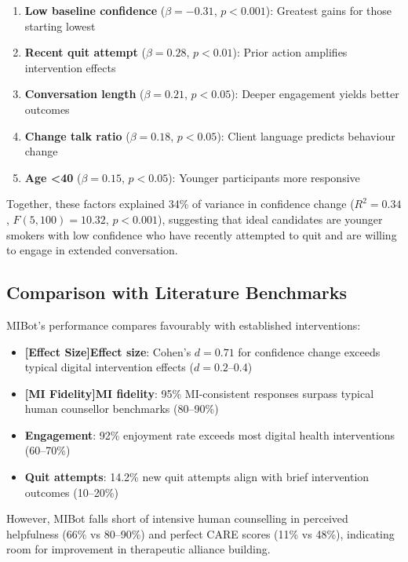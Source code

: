 \begin{enumerate}
\item \textbf{Low baseline confidence} ($\beta=-0.31$, $p<0.001$): Greatest gains for those starting lowest
\item \textbf{Recent quit attempt} ($\beta=0.28$, $p<0.01$): Prior action amplifies intervention effects
\item \textbf{Conversation length} ($\beta=0.21$, $p<0.05$): Deeper engagement yields better outcomes
\item \textbf{Change talk ratio} ($\beta=0.18$, $p<0.05$): Client language predicts behaviour change
\item \textbf{Age <40} ($\beta=0.15$, $p<0.05$): Younger participants more responsive
\end{enumerate}

Together, these factors explained 34\% of variance in confidence change ($R^2=0.34$, $F(5,100)=10.32$, $p<0.001$), suggesting that ideal candidates are younger smokers with low confidence who have recently attempted to quit and are willing to engage in extended conversation.

\subsection{Comparison with Literature Benchmarks}

MIBot's performance compares favourably with established interventions:

\begin{itemize}
\item \textbf{[Effect Size]Effect size}: Cohen's $d=0.71$ for confidence change exceeds typical digital intervention effects ($d=0.2$--0.4) \citep{Whittaker2016}
\item \textbf{[MI Fidelity]MI fidelity}: 95\% MI-consistent responses surpass typical human counsellor benchmarks (80--90\%) \citep{Moyers2016}
\item \textbf{Engagement}: 92\% enjoyment rate exceeds most digital health interventions (60--70\%) \citep{Perski2017}
\item \textbf{Quit attempts}: 14.2\% new quit attempts align with brief intervention outcomes (10--20\%) \citep{Stead2013}
\end{itemize}

However, MIBot falls short of intensive human counselling in perceived helpfulness (66\% vs 80--90\%) and perfect CARE scores (11\% vs 48\%), indicating room for improvement in therapeutic alliance building.

